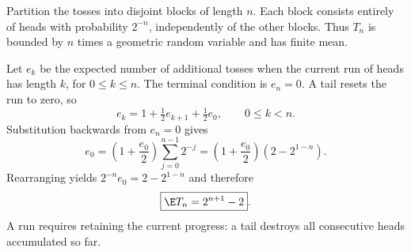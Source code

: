 Partition the tosses into disjoint blocks of length $n$. Each block consists entirely of heads with probability $2^{-n}$, independently of the other blocks. Thus $T_n$ is bounded by $n$ times a geometric random variable and has finite mean.

Let $e_k$ be the expected number of additional tosses when the current run of heads has length $k$, for $0\le k\le n$. The terminal condition is $e_n=0$. A tail resets the run to zero, so
\[
 e_k=1+\tfrac12e_{k+1}+\tfrac12e_0,
 \qquad 0\le k<n.
\]
Substitution backwards from $e_n=0$ gives
\[
 e_0=\left(1+\frac{e_0}{2}\right)
       \sum_{j=0}^{n-1}2^{-j}
     =\left(1+\frac{e_0}{2}\right)(2-2^{1-n}).
\]
Rearranging yields $2^{-n}e_0=2-2^{1-n}$ and therefore
\[
 \boxed{\E T_n=2^{n+1}-2}.
\]
A run requires retaining the current progress: a tail destroys all consecutive heads accumulated so far.
